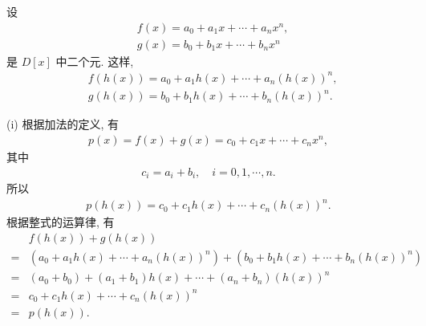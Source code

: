 \begin{pf}
    设
    \begin{align*}
         & f(x) = a_0 + a_1 x + \cdots + a_n x^n, \\
         & g(x) = b_0 + b_1 x + \cdots + b_n x^n
    \end{align*}
    是 $D[x]$ 中二个元. 这样,
    \begin{align*}
         & f(h(x)) = a_0 + a_1 h(x) + \cdots + a_n (h(x))^n, \\
         & g(h(x)) = b_0 + b_1 h(x) + \cdots + b_n (h(x))^n.
    \end{align*}

    (i) 根据加法的定义, 有
    \begin{align*}
        p(x) = f(x) + g(x) = c_0 + c_1 x + \cdots + c_n x^n,
    \end{align*}
    其中
    \begin{align*}
        c_i = a_i + b_i, \quad i = 0,1,\cdots,n.
    \end{align*}
    所以
    \begin{align*}
        p(h(x)) = c_0 + c_1 h(x) + \cdots + c_n (h(x))^n.
    \end{align*}
    根据整式的运算律, 有
    \begin{align*}
             & f(h(x)) + g(h(x))                                                                   \\
        = {} & (a_0 + a_1 h(x) + \cdots + a_n (h(x))^n) + (b_0 + b_1 h(x) + \cdots + b_n (h(x))^n) \\
        = {} & (a_0 + b_0) + (a_1 + b_1) h(x) + \cdots + (a_n + b_n) (h(x))^n                      \\
        = {} & c_0 + c_1 h(x) + \cdots + c_n (h(x))^n                                              \\
        = {} & p(h(x)).
    \end{align*}


\end{pf}
